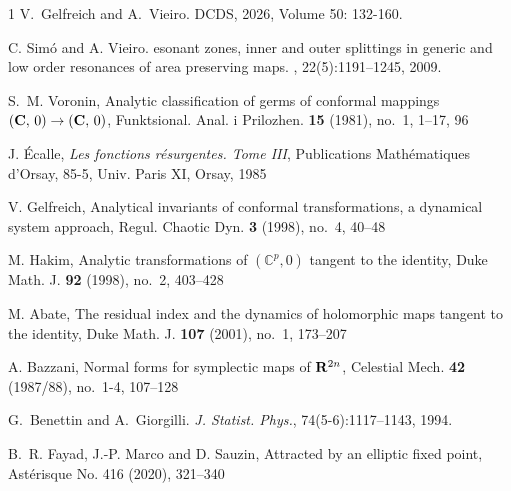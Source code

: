 \documentclass[a4paper,12pt]{article}
\begin{document}
\begin{thebibliography}{1}
	V.~Gelfreich and A.~Vieiro.
     DCDS, 2026, Volume 50: 132-160.



{C}. {S}im\'o and {A}. {V}ieiro.
esonant zones, inner and outer splittings in generic and low order
  resonances of area preserving maps.
, 22(5):1191--1245, 2009.



S.~M. Voronin, Analytic classification of germs of conformal mappings $({\bf C},\,0)\rightarrow ({\bf C},\,0)$, Funktsional. Anal. i Prilozhen. {\bf 15} (1981), no.~1, 1--17, 96


J. \'Ecalle, {\it Les fonctions r\'esurgentes. Tome III}, Publications Math\'ematiques d'Orsay, 85-5, Univ. Paris XI, Orsay, 1985

V. Gelfreich, Analytical invariants of conformal transformations, a dynamical system approach, Regul. Chaotic Dyn. {\bf 3} (1998), no.~4, 40--48

M. Hakim, Analytic transformations of $(\mathbb C^p,0)$ tangent to the identity, Duke Math. J. {\bf 92} (1998), no.~2, 403--428


M. Abate, The residual index and the dynamics of holomorphic maps tangent to the identity, Duke Math. J. {\bf 107} (2001), no.~1, 173--207

A. Bazzani, Normal forms for symplectic maps of ${\bf R}^{2n}$, Celestial Mech. {\bf 42} (1987/88), no.~1-4, 107--128

G.~Benettin and A.~Giorgilli.
\newblock \emph{ J. Statist. Phys.}, 74(5-6):1117--1143, 1994.


B.~R. Fayad, J.-P. Marco and D. Sauzin, Attracted by an elliptic fixed point, Ast\'erisque No. 416 (2020), 321--340

\end{thebibliography}
\end{document}
